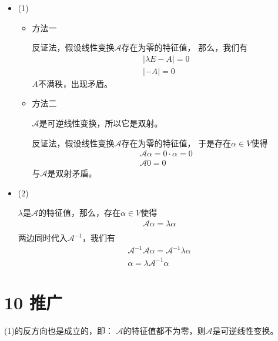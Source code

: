 \documentclass{article}
\begin{document}
\begin{itemize}
  \item (1)

        \begin{itemize}
          \item 方法一

                反证法，假设线性变换$\mathscr{A}$存在为零的特征值，
                那么，我们有
                \begin{align*}
                  |\lambda E - A| = 0 \\
                  |-A| = 0
                \end{align*}
                $A$不满秩，出现矛盾。

          \item 方法二

                $\mathscr{A}$是可逆线性变换，所以它是双射。

                反证法，假设线性变换$\mathscr{A}$存在为零的特征值，
                于是存在$\alpha \in V$使得
                \begin{align*}
                  \mathscr{A} \alpha = 0 \cdot \alpha = 0 \\
                  \mathscr{A} 0 = 0
                \end{align*}
                与$\mathscr{A}$是双射矛盾。
        \end{itemize}

  \item (2)

        $\lambda$是$\mathscr{A}$的特征值，那么，存在$\alpha \in V$使得
        \begin{align*}
          \mathscr{A} \alpha = \lambda \alpha \\
        \end{align*}
        两边同时代入$\mathscr{A}^{-1}$，我们有
        \begin{align*}
          \mathscr{A}^{-1} \mathscr{A} \alpha = \mathscr{A}^{-1} \lambda \alpha \\
          \alpha = \lambda \mathscr{A}^{-1} \alpha
        \end{align*}
\end{itemize}

\section*{10 推广}

 (1)的反方向也是成立的，即：
$\mathscr{A}$的特征值都不为零，则$\mathscr{A}$是可逆线性变换。
\end{document}
